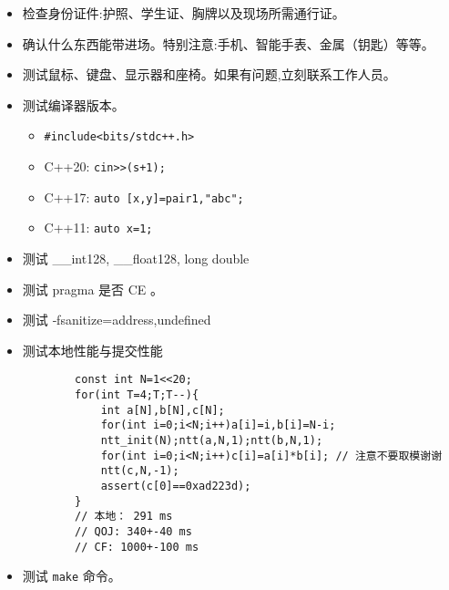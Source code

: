 \begin{itemize}
    \item 检查身份证件:护照、学生证、胸牌以及现场所需通行证。
    \item 确认什么东西能带进场。特别注意:手机、智能手表、金属（钥匙）等等。
    \item 测试鼠标、键盘、显示器和座椅。如果有问题,立刻联系工作人员。
    \item 测试编译器版本。
    \begin{itemize}
        \item  \texttt{\#include<bits/stdc++.h>}
        \item  C++20: \texttt{cin>>(s+1);}
        \item  C++17: \texttt{auto [x,y]=pair{1,"abc"};}
        \item  C++11: \texttt{auto x=1;}
    \end{itemize}
    \item 测试 \_\_int128, \_\_float128, long double
    \item 测试 pragma 是否 CE 。
    \item 测试 ‐fsanitize=address,undefined
    \item 测试本地性能与提交性能
        \begin{verbatim}
        const int N=1<<20;
        for(int T=4;T;T--){
            int a[N],b[N],c[N];
            for(int i=0;i<N;i++)a[i]=i,b[i]=N-i;
            ntt_init(N);ntt(a,N,1);ntt(b,N,1);
            for(int i=0;i<N;i++)c[i]=a[i]*b[i]; // 注意不要取模谢谢
            ntt(c,N,-1);
            assert(c[0]==0xad223d);
        }
        // 本地： 291 ms
        // QOJ: 340+-40 ms
        // CF: 1000+-100 ms
        \end{verbatim}
    \item 测试 \verb|make| 命令。
\end{itemize}




